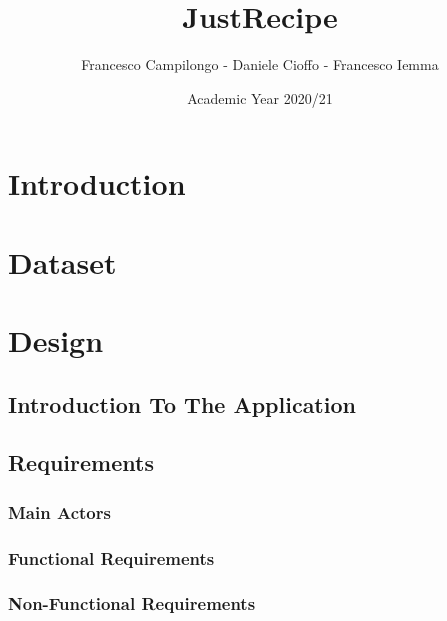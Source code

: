 \documentclass[a4paper]{report}
\begin{document}
\title{\Huge{JustRecipe}}
\author{\Large{Francesco Campilongo - Daniele Cioffo - Francesco Iemma}}
\date{Academic Year 2020/21}
\maketitle
\tableofcontents

\chapter*{Introduction}

\chapter{Dataset}


\chapter{Design}
\section{Introduction To The Application}
\section{Requirements}
\subsection{Main Actors}
\subsection{Functional Requirements}
\subsection{Non-Functional Requirements}
\end{document}
